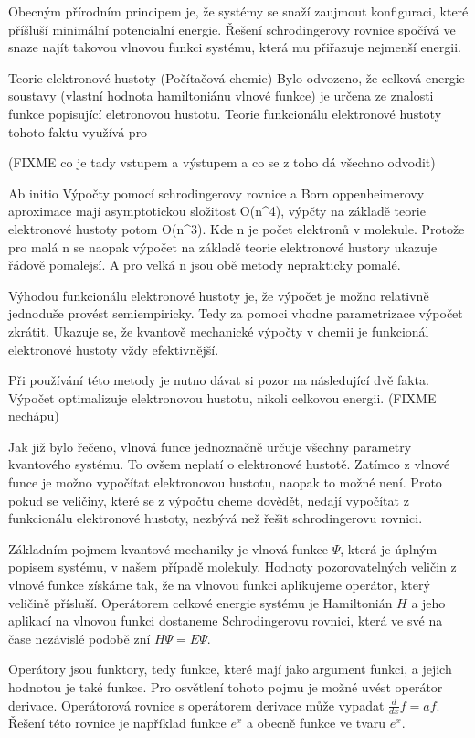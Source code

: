 \documentclass[
  color, %
  table, %
  lof,   %
  lot,   %
]{fithesis3}
\begin{document}
Obecným přírodním principem je, že systémy se snaží zaujmout konfiguraci, které příšluší minimální potencialní energie. Řešení schrodingerovy rovnice spočívá ve snaze najít takovou vlnovou funkci systému, která mu přiřazuje nejmenší energii. 

Teorie elektronové hustoty (Počítačová chemie)
Bylo odvozeno, že celková energie soustavy (vlastní hodnota hamiltoniánu vlnové funkce) je určena ze znalosti funkce popisující eletronovou hustotu. Teorie funkcionálu elektronové hustoty tohoto faktu využívá pro

(FIXME co je tady vstupem a výstupem a co se z toho dá všechno odvodit)

Ab initio
Výpočty pomocí schrodingerovy rovnice a Born oppenheimerovy aproximace mají asymptotickou složitost O(n^4), výpčty na základě teorie elektronové hustoty potom O(n^3). Kde n je počet elektronů v molekule. Protože pro malá n se naopak výpočet na základě teorie elektronové hustory ukazuje řádově pomalejsí. A pro velká n jsou obě metody neprakticky pomalé.

Výhodou funkcionálu elektronové hustoty je, že výpočet je možno relativně jednoduše provést semiempiricky. Tedy za pomoci vhodne parametrizace výpočet zkrátit. Ukazuje se, že kvantově mechanické výpočty v chemii je funkcionál elektronové hustoty vždy efektivnější.

Při používání této metody je nutno dávat si pozor na následující dvě fakta. Výpočet optimalizuje elektronovou hustotu, nikoli celkovou energii. (FIXME nechápu)

Jak již bylo řečeno, vlnová funce jednoznačně určuje všechny parametry kvantového systému. To ovšem neplatí o elektronové hustotě. Zatímco z vlnové funce je možno vypočítat elektronovou hustotu, naopak to možné není. Proto pokud se veličiny, které se z výpočtu cheme dovědět,  nedají vypočítat z funkcionálu elektronové hustoty, nezbývá než řešit schrodingerovu rovnici.




Základním pojmem kvantové mechaniky je vlnová funkce $\Psi$, která je úplným popisem systému, v našem případě molekuly. Hodnoty pozorovatelných veličin z vlnové funkce získáme tak, že na vlnovou funkci aplikujeme operátor, který veličině přísluší. Operátorem celkové energie systému je Hamiltonián $H$ a jeho aplikací na vlnovou funkci dostaneme Schrodingerovu rovnici, která ve své na čase nezávislé podobě zní $H\Psi = E\Psi$.

Operátory jsou funktory, tedy funkce, které mají jako argument funkci, a jejich hodnotou je také funkce. Pro osvětlení tohoto pojmu je možné uvést operátor derivace. Operátorová rovnice s operátorem derivace může vypadat $\frac{d}{dx}f = af$. Řešení této rovnice je například funkce $e^x$ a obecně funkce ve tvaru $e^x$.
\end{document}
